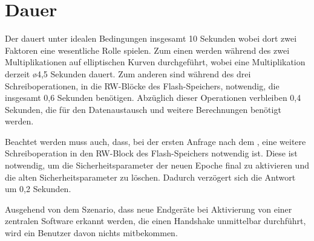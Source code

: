 \section{Dauer}

Der  dauert unter idealen Bedingungen insgesamt 10 Sekunden wobei dort zwei Faktoren eine wesentliche Rolle spielen.
Zum einen werden während des  zwei Multiplikationen auf elliptischen Kurven durchgeführt, wobei eine Multiplikation derzeit \o 4,5 Sekunden dauert.
Zum anderen sind während des  drei Schreiboperationen, in die RW-Blöcke des Flash-Speichers, notwendig, die insgesamt 0,6 Sekunden benötigen.
Abzüglich dieser Operationen verbleiben 0,4 Sekunden, die für den Datenaustausch und weitere Berechnungen benötigt werden.

Beachtet werden muss auch, dass, bei der ersten Anfrage nach dem , eine weitere Schreiboperation in den RW-Block des Flash-Speichers notwendig ist.
Diese ist notwendig, um die Sicherheitsparameter der neuen Epoche final zu aktivieren und die alten Sicherheitsparameter zu löschen. Dadurch verzögert sich
die Antwort um 0,2 Sekunden.

Ausgehend von dem Szenario, dass neue Endgeräte bei Aktivierung von einer zentralen Software erkannt werden, die einen Handshake unmittelbar durchführt,
wird ein Benutzer davon nichts mitbekommen.
